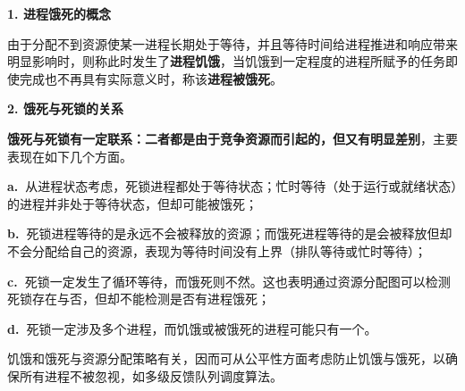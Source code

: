 {\textbf{1. 进程饿死的概念}}

{由于分配不到资源使某一进程长期处于等待，并且等待时间给进程推进和响应带来明显影响时，则称此时发生了}\textbf{进程饥饿}{，当饥饿到一定程度的进程所赋予的任务即使完成也不再具有实际意义时，称该}\textbf{进程被饿死}{。}

\textbf{{2. 饿死与死锁的关系}}

\textbf{{饿死与死锁有一定联系：二者都是由于竞争资源而引起的，但又有明显差别}}，主要表现在如下几个方面。

\textbf{a.~}从进程状态考虑，死锁进程都处于等待状态；忙时等待（处于运行或就绪状态）的进程并非处于等待状态，但却可能被饿死；

\textbf{b.~}死锁进程等待的是永远不会被释放的资源；而饿死进程等待的是会被释放但却不会分配给自己的资源，表现为等待时间没有上界（排队等待或忙时等待）；

\textbf{c.~}死锁一定发生了循环等待，而饿死则不然。这也表明通过资源分配图可以检测死锁存在与否，但却不能检测是否有进程饿死；

\textbf{d.~}死锁一定涉及多个进程，而饥饿或被饿死的进程可能只有一个。

{饥饿和饿死与资源分配策略有关，因而可从公平性方面考虑防止饥饿与饿死，以确保所有进程不被忽视，如多级反馈队列调度算法。}\\
